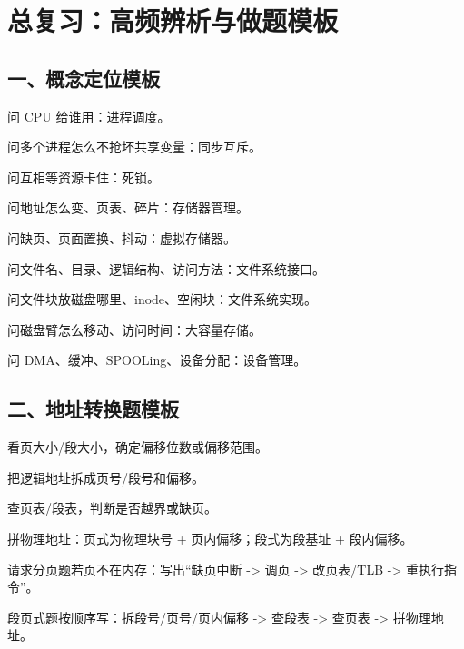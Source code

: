 \chapter*{总复习：高频辨析与做题模板}
{}

\section*{一、概念定位模板}
{}
\begin{points}
  \item 问 CPU 给谁用：进程调度。
  \item 问多个进程怎么不抢坏共享变量：同步互斥。
  \item 问互相等资源卡住：死锁。
  \item 问地址怎么变、页表、碎片：存储器管理。
  \item 问缺页、页面置换、抖动：虚拟存储器。
  \item 问文件名、目录、逻辑结构、访问方法：文件系统接口。
  \item 问文件块放磁盘哪里、inode、空闲块：文件系统实现。
  \item 问磁盘臂怎么移动、访问时间：大容量存储。
  \item 问 DMA、缓冲、SPOOLing、设备分配：设备管理。
\end{points}

\section*{二、地址转换题模板}
{}
\begin{points}
  \item 看页大小/段大小，确定偏移位数或偏移范围。
  \item 把逻辑地址拆成页号/段号和偏移。
  \item 查页表/段表，判断是否越界或缺页。
  \item 拼物理地址：页式为物理块号 + 页内偏移；段式为段基址 + 段内偏移。
  \item 请求分页题若页不在内存：写出“缺页中断 -> 调页 -> 改页表/TLB -> 重执行指令”。
  \item 段页式题按顺序写：拆段号/页号/页内偏移 -> 查段表 -> 查页表 -> 拼物理地址。
\end{points}


